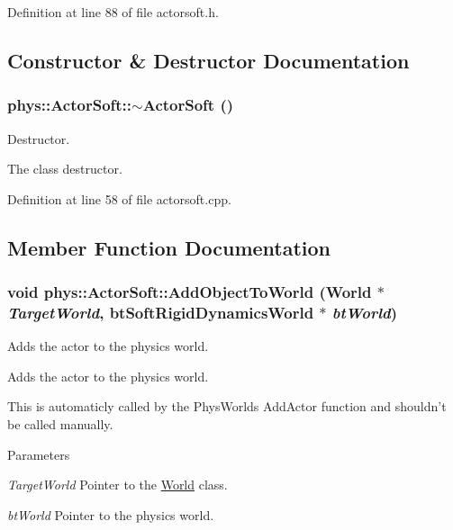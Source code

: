 Definition at line 88 of file actorsoft.h.



\subsection{Constructor \& Destructor Documentation}
\hypertarget{classphys_1_1ActorSoft_a636c145f1e468fd45adc8da2a1708fbe}{
\subsubsection[{$\sim$ActorSoft}]{\setlength{\rightskip}{0pt plus 5cm}phys::ActorSoft::$\sim$ActorSoft ()}}
\label{d4/d23/classphys_1_1ActorSoft_a636c145f1e468fd45adc8da2a1708fbe}


Destructor. 

The class destructor. 

Definition at line 58 of file actorsoft.cpp.



\subsection{Member Function Documentation}
\hypertarget{classphys_1_1ActorSoft_a3a704ab32f847a5d0e060f8a592efefd}{
\subsubsection[{AddObjectToWorld}]{\setlength{\rightskip}{0pt plus 5cm}void phys::ActorSoft::AddObjectToWorld ({\bf World} $\ast$ {\em TargetWorld}, \/  btSoftRigidDynamicsWorld $\ast$ {\em btWorld})}}
\label{d4/d23/classphys_1_1ActorSoft_a3a704ab32f847a5d0e060f8a592efefd}


Adds the actor to the physics world. 

Adds the actor to the physics world. \par
 This is automaticly called by the PhysWorlds AddActor function and shouldn't be called manually. 
\begin{DoxyParams}{Parameters}
\item[{\em TargetWorld}]Pointer to the \hyperlink{classphys_1_1World}{World} class. \item[{\em btWorld}]Pointer to the physics world. \end{DoxyParams}


